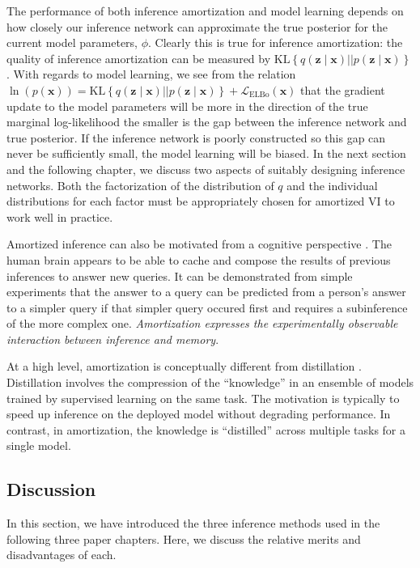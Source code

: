 The performance of both inference amortization and model learning depends on how closely our inference network can approximate the true posterior for the current model parameters, $\phi$. Clearly this is true for inference amortization: the quality of inference amortization can be measured by $\text{KL}\left\{q(\mathbf{z}\mid\mathbf{x})||p(\mathbf{z}\mid\mathbf{x})\right\}$. With regards to model learning, we see from the relation $\ln(p(\mathbf{x}))=\text{KL}\left\{q(\mathbf{z}\mid\mathbf{x})||p(\mathbf{z}\mid\mathbf{x})\right\}+\mathcal{L}_{\text{ELBo}}(\mathbf{x})$ that the gradient update to the model parameters will be more in the direction of the true marginal log-likelihood the smaller is the gap between the inference network and true posterior. If the inference network is poorly constructed so this gap can never be sufficiently small, the model learning will be biased. In the next section and the following chapter, we discuss two aspects of suitably designing inference networks. Both the factorization of the distribution of $q$ and the individual distributions for each factor must be appropriately chosen for amortized VI to work well in practice.

Amortized inference can also be motivated from a cognitive perspective \citep{Gershman2014}. The human brain appears to be able to cache and compose the results of previous inferences to answer new queries. It can be demonstrated from simple experiments that the answer to a query can be predicted from a person's answer to a simpler query if that simpler query occured first and requires a subinference of the more complex one. \emph{Amortization expresses the experimentally observable interaction between inference and memory}.

At a high level, amortization is conceptually different from distillation \citep{hinton2015distilling}. Distillation involves the compression of the ``knowledge'' in an ensemble of models trained by supervised learning on the same task. The motivation is typically to speed up inference on the deployed model without degrading performance. In contrast, in amortization, the knowledge is ``distilled'' across multiple tasks for a single model.

\subsection{Discussion}
In this section, we have introduced the three inference methods used in the following three paper chapters. Here, we discuss the relative merits and disadvantages of each.

